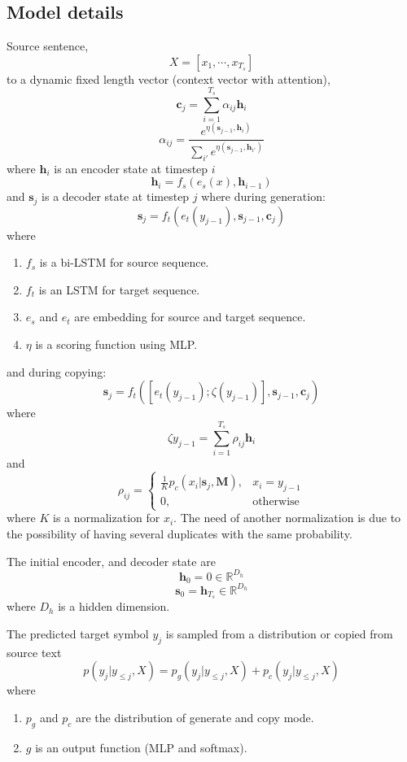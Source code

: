 \documentclass{article}
\begin{document}
\subsection{Model details}
  Source sentence,
  \[
    X = [x_1, \cdots, x_{T_s}]
  \] to a dynamic fixed length vector (context vector with attention),
  \[
    \mathbf{c}_j = \sum_{i = 1}^{T_s} \alpha_{ij} \mathbf{h}_i
  \]
  \[
    \alpha_{ij} = \frac{e^{\eta(\mathbf{s}_{j-1}, \mathbf{h}_i)}}{\sum_{i'}e^{\eta(\mathbf{s}_{j-1}, \mathbf{h}_{i'})}}
  \]
  where $\mathbf{h}_i$ is an encoder state at timestep $i$
  \[
    \mathbf{h}_i = f_s(e_s(x), \mathbf{h}_{i-1})
  \]
  and $\mathbf{s}_j$ is a decoder state at timestep $j$ where during generation:
  \[
    \mathbf{s}_j = f_t(e_t(y_{j-1}), \mathbf{s}_{j-1}, \mathbf{c}_{j})
  \]
  where
  \begin{enumerate}
    \item $f_s$ is a bi-LSTM for source sequence.
    \item $f_t$ is an LSTM for target sequence.
    \item $e_s$ and $e_t$ are embedding for source and target sequence.
    \item $\eta$ is a scoring function using MLP.
  \end{enumerate}
  and during copying:
  \[
    \mathbf{s}_j = f_t([e_t(y_{j-1}); \zeta(y_{j-1})], \mathbf{s}_{j-1}, \mathbf{c}_{j})
  \]
  where
  \[
    \zeta{y_{j-1}} = \sum_{i=1}^{T_s} \rho_{ij} \mathbf{h}_i
  \]
  and
  \[
    \rho_{ij} =
    \begin{cases}
      \frac{1}{K} p_c(x_i|\mathbf{s}_j, \mathbf{M}), & x_i = y_{j-1} \\
      0, & \text{otherwise}
    \end{cases}
  \]
  where $K$ is a normalization for $x_i$. The need of another normalization is due to the possibility of having several duplicates with the same probability.

  The initial encoder, and decoder state are
  \[
    \mathbf{h}_0 = 0 \in \mathbb{R}^{D_h}
  \]
  \[
    \mathbf{s}_0 = \mathbf{h}_{T_s} \in \mathbb{R}^{D_h}
  \]
  where $D_h$ is a hidden dimension.

  The predicted target symbol $y_j$ is sampled from a distribution or copied from source text
  \[
    p(y_j|y_{\leq j}, X) = p_g(y_j|y_{\leq j}, X) + p_c(y_j|y_{\leq j}, X)
  \]
  where
  \begin{enumerate}
    \item $p_g$ and $p_c$ are the distribution of generate and copy mode.
    \item $g$ is an output function (MLP and softmax).
    \end{enumerate}
\end{document}
